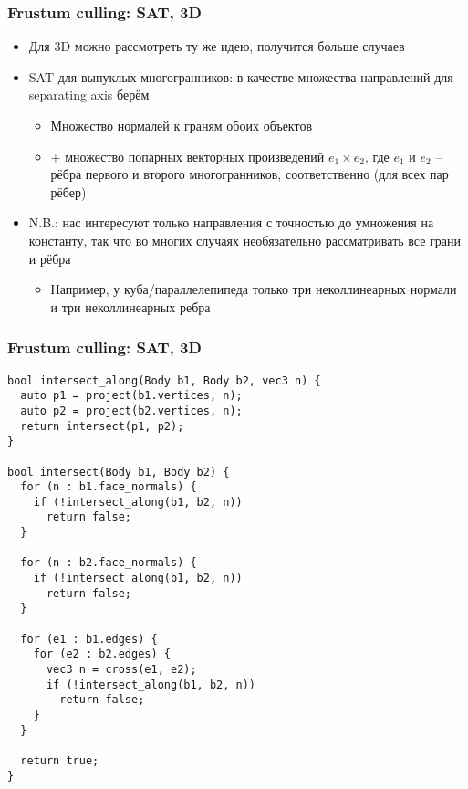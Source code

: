 \documentclass{beamer}
\begin{document}
\begin{frame}[fragile]
\frametitle{Frustum culling: SAT, 3D}
\begin{itemize}
\item Для 3D можно рассмотреть ту же идею, получится больше случаев
\pause
\item SAT для выпуклых многогранников: в качестве множества направлений для separating axis берём
\begin{itemize}
\item Множество нормалей к граням обоих объектов
\item + множество попарных векторных произведений \begin{math}e_1 \times e_2\end{math}, где \begin{math}e_1\end{math} и \begin{math}e_2\end{math} -- рёбра первого и второго многогранников, соответственно (для всех пар рёбер)
\end{itemize}
\pause
\item N.B.: нас интересуют только направления с точностью до умножения на константу, так что во многих случаях необязательно рассматривать все грани и рёбра
\pause
\begin{itemize}
\item Например, у куба/параллелепипеда только три неколлинеарных нормали и три неколлинеарных ребра
\end{itemize}
\end{itemize}
\end{frame}

\begin{frame}[fragile]
\fontsize{8pt}{8pt}
\frametitle{Frustum culling: SAT, 3D}
\begin{verbatim}
bool intersect_along(Body b1, Body b2, vec3 n) {
  auto p1 = project(b1.vertices, n);
  auto p2 = project(b2.vertices, n);
  return intersect(p1, p2);
}

bool intersect(Body b1, Body b2) {
  for (n : b1.face_normals) {
    if (!intersect_along(b1, b2, n))
      return false;
  }

  for (n : b2.face_normals) {
    if (!intersect_along(b1, b2, n))
      return false;
  }

  for (e1 : b1.edges) {
    for (e2 : b2.edges) {
      vec3 n = cross(e1, e2);
      if (!intersect_along(b1, b2, n))
        return false;
    }
  }

  return true;
}
\end{verbatim}
\end{frame}
\end{document}
